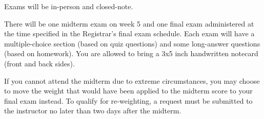 Exams will be in-person and closed-note.

There will be one midterm exam on week 5 and one final exam administered at the time specified in the Registrar’s final exam schedule.
Each exam will have a multiple-choice section (based on quiz questions) and some long-answer questions (based on homework).
You are allowed to bring a 3x5 inch handwritten notecard (front and back sides).

If you cannot attend the midterm due to extreme circumstances, you may choose to move the weight that would have been applied to the midterm score to your final exam instead.
To qualify for re-weighting, a request must be submitted to the instructor no later than two days after the midterm.


